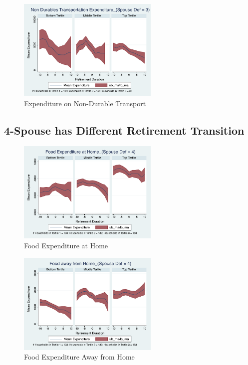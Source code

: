 \documentclass[11pt,onecolumn]{article}
\begin{document}
\begin{figure}[h]
	\caption{Expenditure on Non-Durable Transport}
	\centering
	\includegraphics[width=0.6\textwidth]{../ConsumptionPostRetirement_by_SpouseDef_Cats/Smoothed/3/spouse_def_total_transport_real.pdf}
\end{figure}
\clearpage


\subsection{4-Spouse has Different Retirement Transition}

\begin{figure}[h]
	\caption{Food Expenditure at Home}
	\centering
	\includegraphics[width=0.6\textwidth]{../ConsumptionPostRetirement_by_SpouseDef_Cats/Smoothed/4/spouse_def_total_foodexp_home_real.pdf}
\end{figure}


\begin{figure}[h]
	\caption{Food Expenditure Away from Home}
	\centering
	\includegraphics[width=0.6\textwidth]{../ConsumptionPostRetirement_by_SpouseDef_Cats/Smoothed/4/spouse_def_total_foodexp_away_real.pdf}
\end{figure}
\end{document}
